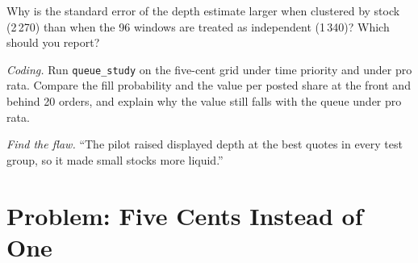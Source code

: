 \begin{exercise}[$\star\star$]\label{exo:mx:tick-size-queues-and-priority:6}
Why is the standard error of the depth estimate larger when clustered by stock (2\,270) than when the 96 windows are treated as independent (1\,340)?
Which should you report?
\end{exercise}

\begin{exercise}[$\star\star\star$]\label{exo:mx:tick-size-queues-and-priority:7}
\emph{Coding.} Run \texttt{queue\_study} on the five-cent grid under time priority and under pro rata. Compare the fill probability and the value per
posted share at the front and behind 20 orders, and explain why the value still falls with the queue under pro rata.
\end{exercise}

\begin{exercise}[$\star\star\star$]\label{exo:mx:tick-size-queues-and-priority:8}
\emph{Find the flaw.} ``The  pilot raised displayed depth at the best quotes in every test group, so it made small stocks more liquid.''
\end{exercise}

\section{Problem: Five Cents Instead of One}

